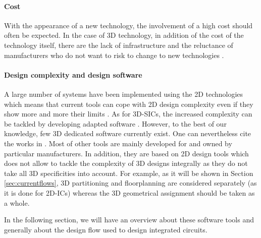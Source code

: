 \paragraph{Cost}
With the appearance of a new technology, the involvement of a high cost should often be expected. In the case of 3D technology, in addition of the cost of the technology itself, there are the lack of infrastructure and the reluctance of manufacturers who do not want to risk to change to new technologies \cite{659500}.

\paragraph{Design complexity and design software}
A large number of systems have been implemented using the 2D technologies which means that current tools can cope with 2D design complexity even if they show more and more their limits \cite{vanderbiest06, PFF10}. As for 3D-SICs, the increased complexity can be tackled by developing adapted software \cite{659500}. However, to the best of our knowledge, few 3D dedicated software currently exist. One can nevertheless cite the works in \cite{1112292,1594713,Xie:2006:DSE:1148015.1148016,4735042}. Most of other tools are mainly developed for and owned by particular manufacturers. In addition, they are based on 2D design tools which does not allow to tackle the complexity of 3D designs integrally as they do not take all 3D specificities into account. For example, as it will be shown in Section \ref{sec:currentflows}, 3D partitioning and floorplanning are considered separately (as it is done for 2D-ICs) whereas the 3D geometrical assignment should be taken as a whole.

In the following section, we will have an overview about these software tools and generally about the design flow used to design integrated circuits.

